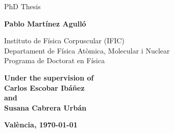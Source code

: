 \begin{center}

\vspace{0.5cm}

{\Large PhD Thesis}


\vspace{1.5cm}


\textbf{\Large{Pablo Martínez Agulló}}\\ %

\vspace{0.5cm}

{Instituto de F\' isica Corpuscular (IFIC) }\\
{Departament de Física Atòmica, Molecular i Nuclear}\\
{Programa de Doctorat en Física}\\

\vspace{1cm}



\textbf{Under the supervision of}\\[3ex]

{\large \textbf{Carlos Escobar Ibáñez}} \\
{\textbf{and}} \\
{\large \textbf{Susana Cabrera Urbán}} \\

\vspace{1.5cm}


{\large \bf{Val\`{e}ncia, \today}}

\end{center}